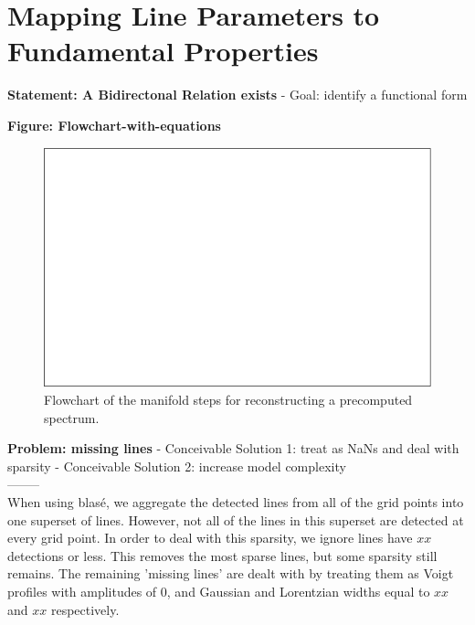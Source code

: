 \documentclass[twocolumn]{aastex631}
\begin{document}
\section{Mapping Line Parameters to Fundamental Properties}
\begin{mdframed}
    \textbf{Statement: A Bidirectonal Relation exists}
    - Goal: identify a functional form
    \textcolor{lightgray}{\blindtext}
\end{mdframed}

\begin{mdframed}
    \textbf{Figure: Flowchart-with-equations}
\end{mdframed}


\begin{figure}
    \includegraphics[width=\textwidth]{images/flowchart_frame2_v0p3.png}
    \caption{Flowchart of the manifold steps for reconstructing a precomputed spectrum.}
\end{figure}



\begin{mdframed}
    \textbf{Problem: missing lines}
    - Conceivable Solution 1: treat as NaNs and deal with sparsity
    - Conceivable Solution 2: increase model complexity
    \\--------\\
    When using blas\'e, we aggregate the detected lines from all of the grid points
    into one superset of lines. However, not all of the lines in this superset are
    detected at every grid point. In order to deal with this sparsity, we ignore lines
    have $xx$ detections or less. This removes the most sparse lines, but some sparsity still
    remains. The remaining 'missing lines' are dealt with by treating them as Voigt profiles
    with amplitudes of 0, and Gaussian and Lorentzian widths equal to $xx$ and $xx$ respectively.
\end{mdframed}
\end{document}

